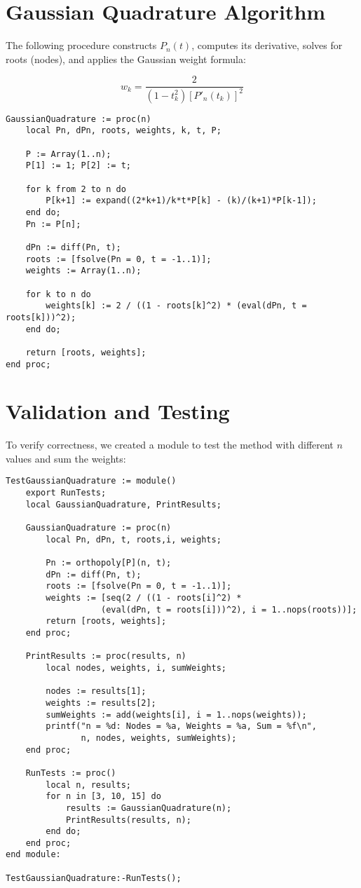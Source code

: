 \documentclass{article}
\begin{document}
\section{Gaussian Quadrature Algorithm}

The following procedure constructs \( P_n(t) \), computes its derivative, solves for roots (nodes), and applies the Gaussian weight formula:

\[
w_k = \frac{2}{(1 - t_k^2)[P'_n(t_k)]^2}
\]

\begin{lstlisting}[language=Maple, caption={Gaussian Quadrature Implementation}]
GaussianQuadrature := proc(n)
    local Pn, dPn, roots, weights, k, t, P;

    P := Array(1..n);
    P[1] := 1; P[2] := t;

    for k from 2 to n do
        P[k+1] := expand((2*k+1)/k*t*P[k] - (k)/(k+1)*P[k-1]);
    end do;
    Pn := P[n];

    dPn := diff(Pn, t);
    roots := [fsolve(Pn = 0, t = -1..1)];
    weights := Array(1..n);

    for k to n do
        weights[k] := 2 / ((1 - roots[k]^2) * (eval(dPn, t = roots[k]))^2);
    end do;

    return [roots, weights];
end proc;
\end{lstlisting}

\section{Validation and Testing}

To verify correctness, we created a module to test the method with different \( n \) values and sum the weights:

\begin{lstlisting}[language=Maple, caption={Testing the Gaussian Quadrature}]
TestGaussianQuadrature := module()
    export RunTests;
    local GaussianQuadrature, PrintResults;

    GaussianQuadrature := proc(n)
        local Pn, dPn, t, roots,i, weights;

        Pn := orthopoly[P](n, t);
        dPn := diff(Pn, t);
        roots := [fsolve(Pn = 0, t = -1..1)];
        weights := [seq(2 / ((1 - roots[i]^2) *
                   (eval(dPn, t = roots[i]))^2), i = 1..nops(roots))];
        return [roots, weights];
    end proc;

    PrintResults := proc(results, n)
        local nodes, weights, i, sumWeights;

        nodes := results[1];
        weights := results[2];
        sumWeights := add(weights[i], i = 1..nops(weights));
        printf("n = %d: Nodes = %a, Weights = %a, Sum = %f\n",
               n, nodes, weights, sumWeights);
    end proc;

    RunTests := proc()
        local n, results;
        for n in [3, 10, 15] do
            results := GaussianQuadrature(n);
            PrintResults(results, n);
        end do;
    end proc;
end module:

TestGaussianQuadrature:-RunTests();
\end{lstlisting}
\end{document}
